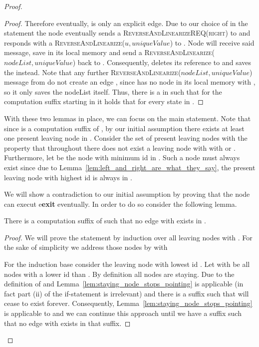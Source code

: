 \documentclass[a4paper,USenglish]{lipics}
\newcommand{\revandlin}[1]{\textsc{ReverseAndLinearize(\ensuremath{#1})}\xspace} \newcommand{\revandlinREQ}[1]{\textsc{ReverseAndLinearizeREQ(#1)}\xspace}
\begin{document}
\begin{proof}
\begin{proof}
Therefore eventually,  is only an explicit edge.
Due to our choice of  in the statement the node  eventually sends a \revandlinREQ{right} to  and  responds with a \revandlin{u,uniqueValue} to .
Node  will receive said message, save  in its local memory and send a \revandlin{nodeList,uniqueValue} back to .
Consequently,  deletes its reference to  and saves the  instead.
Note that any further \revandlin{nodeList,uniqueValue} message from  do not create an edge , since  has no node  in its local memory with , so it only saves the nodeList itself.
Thus, there is a  in  such that for the computation suffix  starting in  it holds that  for every state in .
\end{proof}

 With these two lemmas in place, we can focus on the main statement.
 Note that since  is a computation suffix of , by our initial assumption there exists at least one present leaving node in .
Consider the set  of present leaving nodes  with the property that throughout  there does not exist a leaving node  with  with  or .
  Furthermore, let  be the node with minimum id in .
  Such a node must always exist since due to Lemma~\ref{lem:left_and_right_are_what_they_say}, the present leaving node with highest id is always in .

We will show a contradiction to our initial assumption by proving that the node  can execut e\textbf{exit} eventually. In order to do so consider the following lemma.

\begin{lemma}
There is a computation suffix  of  such that no edge  with  exists in .
\end{lemma}

\begin{proof}
We will prove the statement by induction over all leaving nodes  with .
For the sake of simplicity we address those nodes by  with 

For the induction base consider the leaving node with lowest id .
Let  with  be all nodes with a lower id than .
By definition all  nodes are staying.
Due to the definition of  and  Lemma~\ref{lem:staying_node_stops_pointing} is applicable (in fact part (ii) of the if-statement is irrelevant) and there is a suffix such that  will cease to exist forever.
Consequently, Lemma~\ref{lem:staying_node_stops_pointing} is applicable to  and we can continue this approach until we have a suffix such that no edge  with  exists in that suffix.


\end{proof}
\end{proof}
\end{document}

